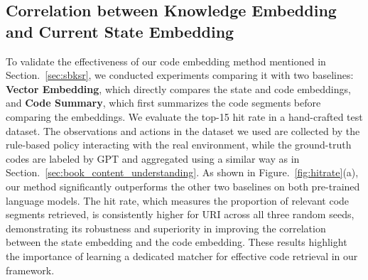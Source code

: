 \subsection{Correlation between Knowledge Embedding and Current State Embedding}
\label{exp:emb}



To validate the effectiveness of our code embedding method mentioned in Section.~\ref{sec:sbksr}, we conducted experiments comparing it with two baselines: \textbf{Vector Embedding}, which directly compares the state and code embeddings, and \textbf{Code Summary}, which first summarizes the code segments before comparing the embeddings. We evaluate the top-15 hit rate in a hand-crafted test dataset. The observations and actions in the dataset we used are collected by the rule-based policy interacting with the real environment, while the ground-truth codes are labeled by GPT and aggregated using a similar way as in Section.~\ref{sec:book_content_understanding}.
As shown in Figure.~\ref{fig:hitrate}(a), our method significantly outperforms the other two baselines on both pre-trained language models. The hit rate, which measures the proportion of relevant code segments retrieved, is consistently higher for URI across all three random seeds, demonstrating its robustness and superiority in improving the correlation between the state embedding and the code embedding. These results highlight the importance of learning a dedicated matcher for effective code retrieval in our framework. 


